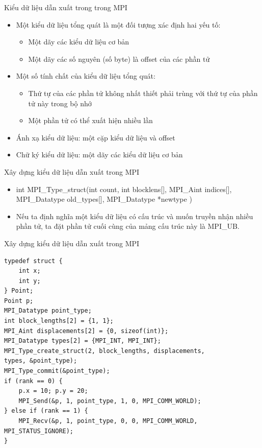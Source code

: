 \documentclass[10pt]{beamer}
\theoremstyle{remark}
\numberwithin{algocf}{section}
\numberwithin{equation}{section}
\numberwithin{dl}{section}
\numberwithin{figure}{section}
\begin{document}
\begin{frame}{Kiểu dữ liệu dẫn xuất trong trong MPI}
    \begin{itemize}
        \item Một kiểu dữ liệu tổng quát là một đối tượng xác định hai yếu tố:
        \begin{itemize}
            \item Một dãy các kiểu dữ liệu cơ bản 
            \item Một dãy các số nguyên (số byte) là offset của các phần tử
        \end{itemize}
        \item Một số tính chất của kiểu dữ liệu tổng quát:
        \begin{itemize}
            \item Thứ tự của các phần tử không nhất thiết phải trùng với thứ tự của phần tử này trong bộ nhớ
            \item Một phần tử có thể xuất hiện nhiều lần
        \end{itemize}
        \item Ánh xạ kiểu dữ liệu: một cặp kiểu dữ liệu và offset
        \item Chữ ký kiểu dữ liệu: một dãy các kiểu dữ liệu cơ bản
    \end{itemize}
\end{frame}

\begin{frame}{Xây dựng kiểu dữ liệu dẫn xuất trong MPI}
    \begin{itemize}
        \item int MPI\_Type\_struct(int count, int blocklens[],
                                    MPI\_Aint indices[], MPI\_Datatype old\_types[],
                                    MPI\_Datatype *newtype )
        \item Nếu ta định nghĩa một kiểu dữ liệu có cấu trúc và muốn truyền nhận nhiều phần tử, ta đặt phần tử cuối cùng của mảng cấu trúc này là MPI\_UB.
    \end{itemize}
\end{frame}

\begin{frame}[fragile]{Xây dựng kiểu dữ liệu dẫn xuất trong MPI}
    \begin{verbatim}
typedef struct {
    int x;
    int y;
} Point;
Point p;
MPI_Datatype point_type;
int block_lengths[2] = {1, 1};
MPI_Aint displacements[2] = {0, sizeof(int)};
MPI_Datatype types[2] = {MPI_INT, MPI_INT};
MPI_Type_create_struct(2, block_lengths, displacements, 
types, &point_type);
MPI_Type_commit(&point_type);
if (rank == 0) {
    p.x = 10; p.y = 20;
    MPI_Send(&p, 1, point_type, 1, 0, MPI_COMM_WORLD);
} else if (rank == 1) {
    MPI_Recv(&p, 1, point_type, 0, 0, MPI_COMM_WORLD, MPI_STATUS_IGNORE);
}
    \end{verbatim}
\end{frame}
\end{document}
